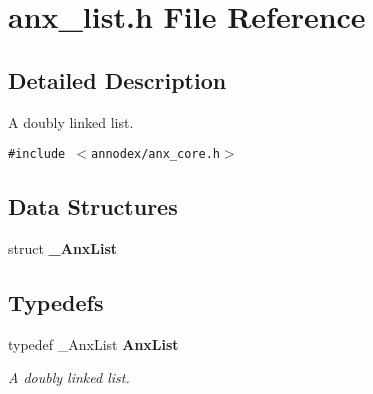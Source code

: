 \section{anx\_\-list.h File Reference}
\label{anx__list_8h}


\subsection{Detailed Description}
A doubly linked list. 



{\tt \#include $<$annodex/anx\_\-core.h$>$}\par
\subsection*{Data Structures}
\begin{CompactItemize}
\item 
struct {\bf \_\-Anx\-List}
\end{CompactItemize}
\subsection*{Typedefs}
\begin{CompactItemize}
\item 
typedef \_\-Anx\-List {\bf Anx\-List}\label{anx__list_8h_a0}

\begin{CompactList}\small\item\em A doubly linked list. \item\end{CompactList}\end{CompactItemize}
